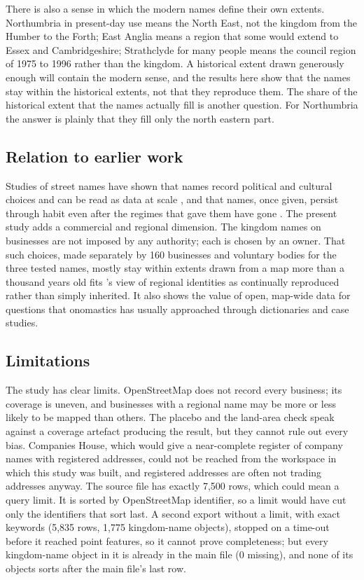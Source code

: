 \documentclass[11pt,a4paper]{article}
\begin{document}
There is also a sense in which the modern names define their own extents. Northumbria in present-day use means the North East, not the kingdom from the Humber to the Forth; East Anglia means a region that some would extend to Essex and Cambridgeshire; Strathclyde for many people means the council region of 1975 to 1996 rather than the kingdom. A historical extent drawn generously enough will contain the modern sense, and the results here show that the names stay within the historical extents, not that they reproduce them. The share of the historical extent that the names actually fill is another question. For Northumbria the answer is plainly that they fill only the north eastern part.

\subsection{Relation to earlier work}
Studies of street names have shown that names record political and cultural choices and can be read as data at scale \citep{azaryahu1996,alderman2000,otoperalias2018,bancilhon2021,gutierrez2022}, and that names, once given, persist through habit even after the regimes that gave them have gone \citep{lightyoung2014}. The present study adds a commercial and regional dimension. The kingdom names on businesses are not imposed by any authority; each is chosen by an owner. That such choices, made separately by 160 businesses and voluntary bodies for the three tested names, mostly stay within extents drawn from a map more than a thousand years old fits \citet{paasi2003}'s view of regional identities as continually reproduced rather than simply inherited. It also shows the value of open, map-wide data for questions that onomastics has usually approached through dictionaries and case studies.

\subsection{Limitations}
The study has clear limits. OpenStreetMap does not record every business; its coverage is uneven, and businesses with a regional name may be more or less likely to be mapped than others. The placebo and the land-area check speak against a coverage artefact producing the result, but they cannot rule out every bias. Companies House, which would give a near-complete register of company names with registered addresses, could not be reached from the workspace in which this study was built, and registered addresses are often not trading addresses anyway. The source file has exactly 7,500 rows, which could mean a query limit. It is sorted by OpenStreetMap identifier, so a limit would have cut only the identifiers that sort last. A second export without a limit, with exact keywords (5,835 rows, 1,775 kingdom-name objects), stopped on a time-out before it reached point features, so it cannot prove completeness; but every kingdom-name object in it is already in the main file (0 missing), and none of its objects sorts after the main file's last row.
\end{document}
